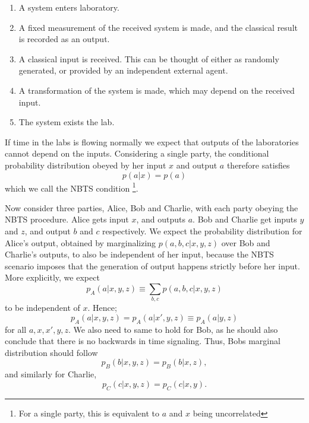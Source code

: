 \documentclass[aps,pra, twocolumn]{revtex4-1}
\begin{document}
\begin{enumerate}
\item A system enters laboratory. 
\item A fixed measurement of the received system is made, and the classical result is recorded as an output. 
\item A classical input is received. This can be thought of  either as randomly generated, or provided by an independent external agent. 
\item A transformation of the system is made, which may depend on the received input.
\item The system exists the lab. 
\end{enumerate}
If time in the labs is flowing normally we expect that outputs of the laboratories cannot depend on the inputs. Considering  a single party, the  conditional probability distribution obeyed by her input $x$ and output $a$  therefore satisfies
\begin{equation}
p(a|x)=p(a)
\end{equation}
which we call the NBTS condition \footnote{For a single party, this is equivalent to $a$ and $x$ being uncorrelated}. 

Now consider three parties, Alice, Bob and Charlie, with each party obeying the NBTS procedure. Alice gets input $x$, and outputs $a$. Bob and Charlie get inputs $y$ and $z$, and output $b$ and $c$ respectively. We expect the probability distribution for Alice's output, obtained by marginalizing $p(a,b,c|x,y,z)$ over Bob and Charlie's outputs, to also be independent of her input, because the NBTS scenario imposes that the generation of output happens strictly before her input. More explicitly, we expect
\begin{equation}
p_A(a|x,y,z) \equiv \sum_{b,c}  p(a,b,c|x,y,z)
\end{equation}
to be independent of $x$. Hence;
\begin{equation} \label{eq:NBTS1} 
p_A(a|x,y,z)=p_A(a|x',y,z) \equiv p_A(a|y,z)
\end{equation}
for all $a,x, x',y,z$. We also need to same to hold for Bob, as he should also conclude that there is no backwards in time signaling. Thus, Bobs marginal distribution should follow
\begin{equation}
p_B(b|x,y,z)=p_B(b|x,z), 
\end{equation}
and similarly for Charlie,
\begin{equation}\label{eq:NBTS2} 
p_C(c|x,y,z)=p_C(c|x,y).
\end{equation}
\end{document}
